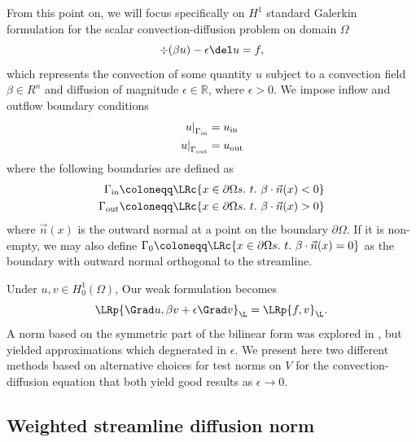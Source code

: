 From this point on, we will focus specifically on $H^1$ standard Galerkin formulation for the scalar convection-diffusion problem on domain $\Omega$
\[
\div(\beta u) - \epsilon \del u = f,
\]
which represents the convection of some quantity $u$ subject to a convection field $\beta \in R^n$ and diffusion of magnitude $\epsilon \in \mathbb{R}$, where $\epsilon > 0$.  We impose inflow and outflow boundary conditions
\begin{align*}
\left.u\right|_{\Gamma_{\rm in}} &= u_{\rm in}\\
\left.u\right|_{\Gamma_{\rm out}} &= u_{\rm out}
\end{align*}
where the following boundaries are defined as 
\begin{align*}
\Gamma_{\rm in}\coloneqq \LRc{x\in \partial \Omega s.\ t.\ \beta\cdot\vec{n}(x) < 0}\\
\Gamma_{\rm out}\coloneqq \LRc{x\in \partial \Omega s.\ t.\ \beta\cdot\vec{n}(x) > 0}
\end{align*}
where $\vec{n}(x)$ is the outward normal at a point on the boundary $\partial \Omega$.  If it is non-empty, we may also define $\Gamma_{0}\coloneqq \LRc{x\in \partial \Omega s.\ t.\ \beta\cdot\vec{n}(x) = 0}$ as the boundary with outward normal orthogonal to the streamline.  

Under $u,v \in H^1_0(\Omega)$, Our weak formulation becomes
\[
\LRp{\Grad u,\beta v + \epsilon \Grad v}_{\L} = \LRp{f,v}_{\L}.
\]
A norm based on the symmetric part of the bilinear form was explored in \cite{DahmenVariationalStabilization}, but yielded approximations which degnerated in $\epsilon$.  We present here two different methods based on alternative choices for test norms on $V$ for the convection-diffusion equation that both yield good results as $\epsilon\rightarrow 0$.  

\subsection{Weighted streamline diffusion norm}


